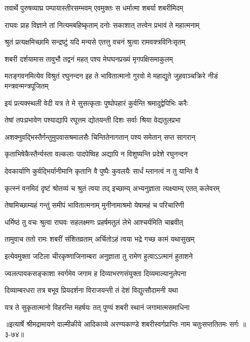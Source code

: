 \twolineshloka
{तवार्थे पुरुषव्याघ्र पम्पायास्तीरसम्भवम्}
{एवमुक्तः स धर्मात्मा शबर्या शबरीमिदम्} %

\twolineshloka
{राघवः प्राह विज्ञाने तां नित्यमबहिष्कृताम्}
{दनोः सकाशात् तत्त्वेन प्रभावं ते महात्मनाम्} %

\twolineshloka
{श्रुतं प्रत्यक्षमिच्छामि सन्द्रष्टुं यदि मन्यसे}
{एतत्तु वचनं श्रुत्वा रामवक्त्रविनिःसृतम्} %

\twolineshloka
{शबरी दर्शयामास तावुभौ तद्वनं महत्}
{पश्य मेघघनप्रख्यं मृगपक्षिसमाकुलम्} %

\threelineshloka
{मतङ्गवनमित्येव विश्रुतं रघुनन्दन}
{इह ते भावितात्मानो गुरवो मे महाद्युते}
{जुहवाञ्चक्रिरे नीडं मन्त्रवन्मन्त्रपूजितम्} %

\twolineshloka
{इयं प्रत्यक्स्थली वेदी यत्र ते मे सुसत्कृताः}
{पुष्पोपहारं कुर्वन्ति श्रमादुद्वेपिभिः करैः} %

\twolineshloka
{तेषां तपःप्रभावेण पश्याद्यापि रघूत्तम}
{द्योतयन्ती दिशः सर्वाः श्रिया वेद्यतुलप्रभा} %

\twolineshloka
{अशक्नुवद्भिस्तैर्गन्तुमुपवासश्रमालसैः}
{चिन्तितेनागतान् पश्य समेतान् सप्त सागरान्} %

\twolineshloka
{कृताभिषेकैस्तैर्न्यस्ता वल्कलाः पादपेष्विह}
{अद्यापि न विशुष्यन्ति प्रदेशे रघुनन्दन} %

\twolineshloka
{देवकार्याणि कुर्वद्भिर्यानीमानि कृतानि वै}
{पुष्पैः कुवलयैः सार्धं म्लानत्वं न तु यान्ति वै} %

\twolineshloka
{कृत्स्नं वनमिदं दृष्टं श्रोतव्यं च श्रुतं त्वया}
{तद् इच्छाम्य् अभ्यनुज्ञाता त्यक्ष्याम्य् एतत् कलेवरम्} %

\twolineshloka
{तेषामिच्छाम्यहं गन्तुं समीपं भावितात्मनाम्}
{मुनीनामाश्रमो येषामहं च परिचारिणी} %

\twolineshloka
{धर्मिष्ठं तु वचः श्रुत्वा राघवः सहलक्ष्मणः}
{प्रहर्षमतुलं लेभे आश्चर्यमिति चाब्रवीत्} %

\twolineshloka
{तामुवाच ततो रामः शबरीं संशितव्रताम्}
{अर्चितोऽहं त्वया भद्रे गच्छ कामं यथासुखम्} %

\twolineshloka
{इत्येवमुक्ता जटिला चीरकृष्णाजिनाम्बरा}
{अनुज्ञाता तु रामेण हुत्वाऽऽत्मानं हुताशने} %

\twolineshloka
{ज्वलत्पावकसङ्काशा स्वर्गमेव जगाम ह}
{दिव्याभरणसंयुक्ता दिव्यमाल्यानुलेपना} %

\twolineshloka
{दिव्याम्बरधरा तत्र बभूव प्रियदर्शना}
{विराजयन्ती तं देशं विद्युत्सौदामनी यथा} %

\twolineshloka
{यत्र ते सुकृतात्मानो विहरन्ति महर्षयः}
{तत् पुण्यं शबरी स्थानं जगामात्मसमाधिना} %


॥इत्यार्षे श्रीमद्रामायणे वाल्मीकीये आदिकाव्ये अरण्यकाण्डे शबरीस्वर्गप्राप्तिः नाम चतुःसप्ततितमः सर्गः ॥३-७४॥

